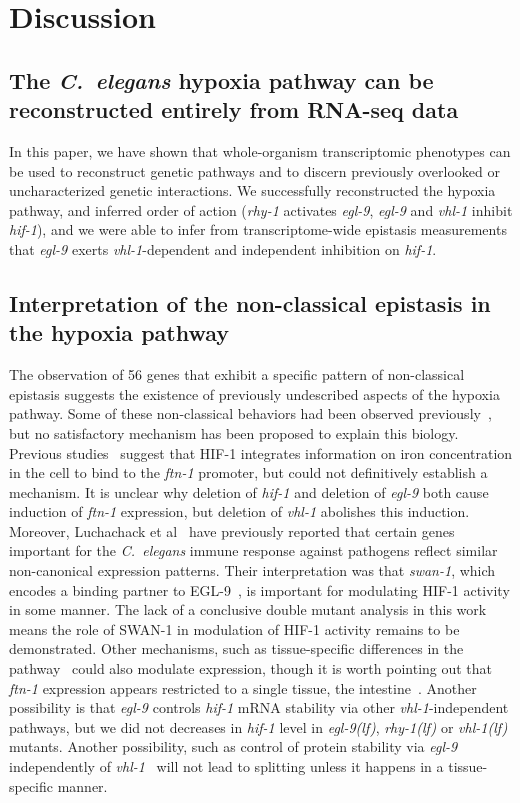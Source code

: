 \documentclass[9pt,twocolumn,twoside]{pnas-new}
\newcommand{\cel}{\emph{C.~elegans}}
\newcommand{\gene}[1]{\mbox{\emph{#1}}}
\newcommand{\ftna}{\gene{ftn-1}}
\newcommand{\egl}{\gene{egl-9(lf)}}
\newcommand{\rhy}{\gene{rhy-1(lf)}}
\newcommand{\vhl}{\gene{vhl-1(lf)}}
\newcommand{\eglp}{EGL-9}
\newcommand{\hifp}{HIF-1}
\newcommand{\hifohtargets}{56}
\begin{document}
\section*{Discussion}
\label{sec:discussion}
\subsection*{The \cel{} hypoxia pathway can be reconstructed entirely from
             RNA-seq data}
In this paper, we have shown that whole-organism transcriptomic phenotypes
can be used to reconstruct genetic pathways and to discern previously overlooked
or uncharacterized genetic interactions. We successfully reconstructed the hypoxia
pathway, and inferred order of action (\gene{rhy-1} activates \gene{egl-9},
\gene{egl-9} and \gene{vhl-1} inhibit \gene{hif-1}), and we were able to infer
from transcriptome-wide epistasis measurements that \gene{egl-9} exerts
\gene{vhl-1}-dependent and independent inhibition on \gene{hif-1}.

\subsection*{Interpretation of the non-classical epistasis in the hypoxia pathway}
The observation of \hifohtargets{} genes that exhibit a specific pattern of
non-classical epistasis suggests the existence of previously undescribed aspects
of the hypoxia pathway. Some of these non-classical behaviors had been observed
previously~\cite{Ackerman2012,Romney2011,Luhachack2012}, but no satisfactory
mechanism has been proposed to explain this biology. Previous
studies~\cite{Romney2011,Ackerman2012} suggest that \hifp{} integrates
information on iron concentration in the cell to bind to the \ftna{} promoter,
but could not definitively establish a mechanism. It is unclear why deletion of
\gene{hif-1} and deletion of \gene{egl-9} both cause induction of \ftna{}
expression, but deletion of \gene{vhl-1} abolishes this induction. Moreover,
Luchachack et al~\cite{Luhachack2012} have previously reported that certain
genes important for the \cel{} immune response against pathogens reflect similar
non-canonical expression patterns. Their interpretation was that \gene{swan-1},
which encodes a binding partner to \eglp{}~\cite{Shao2010}, is important for
modulating \hifp{} activity in some manner. The lack of a conclusive double
mutant analysis in this work means the role of SWAN-1 in modulation of \hifp{}
activity remains to be demonstrated. Other mechanisms, such as tissue-specific
differences in the pathway~\cite{Budde2010} could also modulate expression,
though it is worth pointing out that \ftna{} expression appears restricted to a
single tissue, the intestine~\cite{Kim2004}. Another possibility is that
\gene{egl-9} controls \gene{hif-1} mRNA stability via other
\gene{vhl-1}-independent pathways, but we did not decreases in \gene{hif-1}
level in \egl{}, \rhy{} or \vhl{} mutants. Another possibility, such as control
of protein stability via \gene{egl-9} independently of
\gene{vhl-1}~\cite{Chintala2012} will not lead to splitting unless it happens in
a tissue-specific manner.
\end{document}
